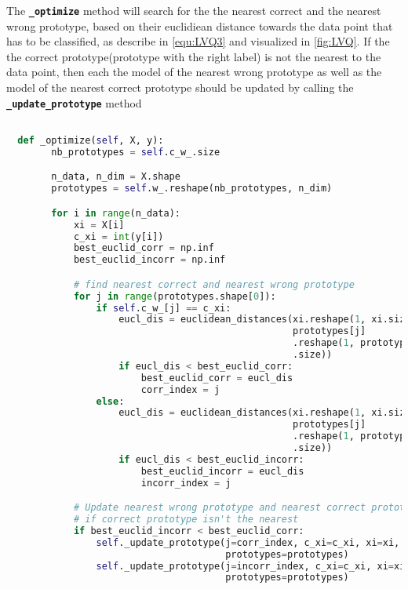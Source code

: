 \documentclass[12pt,oneside,a4paper,parskip]{scrbook}
\begin{document}
The \textbf{\texttt{\_optimize}} method will search for the the nearest correct and the nearest wrong prototype, based on 
their euclidiean distance towards the data point that has to be classified, as describe in \ref{equ:LVQ3} and visualized in \ref{fig:LVQ}.
If the the correct prototype(prototype with the right label) is not the nearest to the data point, then each the model of the nearest wrong
prototype as well as the model of the nearest correct prototype should be updated by calling the \textbf{\texttt{\_update\_prototype}} method

\begin{lstlisting}[label=lst:optimize,
  language=python,
  firstnumber=1,
  caption=Method \texttt{\_optimize} from the scikit-multiflow framework]			   

  def _optimize(self, X, y):
        nb_prototypes = self.c_w_.size

        n_data, n_dim = X.shape
        prototypes = self.w_.reshape(nb_prototypes, n_dim)

        for i in range(n_data):
            xi = X[i]
            c_xi = int(y[i])
            best_euclid_corr = np.inf
            best_euclid_incorr = np.inf

            # find nearest correct and nearest wrong prototype
            for j in range(prototypes.shape[0]):
                if self.c_w_[j] == c_xi:
                    eucl_dis = euclidean_distances(xi.reshape(1, xi.size),
                                                   prototypes[j]
                                                   .reshape(1, prototypes[j]
                                                   .size))
                    if eucl_dis < best_euclid_corr:
                        best_euclid_corr = eucl_dis
                        corr_index = j
                else:
                    eucl_dis = euclidean_distances(xi.reshape(1, xi.size),
                                                   prototypes[j]
                                                   .reshape(1, prototypes[j]
                                                   .size))
                    if eucl_dis < best_euclid_incorr:
                        best_euclid_incorr = eucl_dis
                        incorr_index = j

            # Update nearest wrong prototype and nearest correct prototype
            # if correct prototype isn't the nearest
            if best_euclid_incorr < best_euclid_corr:
                self._update_prototype(j=corr_index, c_xi=c_xi, xi=xi,
                                       prototypes=prototypes)
                self._update_prototype(j=incorr_index, c_xi=c_xi, xi=xi,
                                       prototypes=prototypes)
\end{lstlisting}
\end{document}
